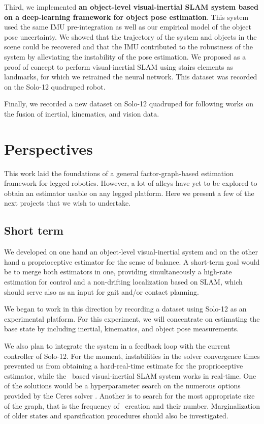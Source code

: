 Third, we implemented \textbf{an object-level visual-inertial SLAM system based on a deep-learning framework for object pose estimation}. This system  used the same 
IMU pre-integration as well as our empirical model of the object pose uncertainty. We showed that the trajectory of the system and objects
in the scene could be recovered and that the IMU contributed to the robustness of the system by alleviating the instability of the pose estimation. We proposed
as a proof of concept to perform visual-inertial SLAM using stairs elements as landmarks, for which we retrained the neural network. This dataset was recorded on the Solo-12 quadruped robot.

Finally, we recorded a new dataset on Solo-12 quadruped for following works on the fusion of inertial, kinematics, and vision data. 

\section{Perspectives}
This work laid the foundations of a general factor-graph-based estimation framework for legged robotics. However, a lot of alleys have yet to be explored 
to obtain an estimator usable on any legged platform. Here we present a few of the next projects that we wish to undertake.

\subsection{Short term}
We developed on one hand an object-level visual-inertial system and on the other hand a proprioceptive estimator for the sense of balance. A short-term goal
would be to merge both estimators in one, providing simultaneously a high-rate estimation for control and a non-drifting localization based on SLAM, which should serve also as an input for gait and/or contact planning. 

We began to work in this direction by recording a dataset using Solo-12 as an experimental platform. For this experiment, we will concentrate on estimating the 
base state by including inertial, kinematics, and object pose measurements. 

We also plan to integrate the system in a feedback loop with the current controller of Solo-12. For the moment, instabilities in the solver convergence times prevented
us from obtaining a hard-real-time estimate for the proprioceptive estimator, while the \apriltag\ based visual-inertial SLAM system works in real-time. One of the solutions would 
be a hyperparameter search on the numerous options provided by the Ceres solver \cite{ceres-solver}. Another is to search for the most appropriate size of the graph,
that is the frequency of \keyframe\ creation and their number. Marginalization of older states and sparsification procedures should also be investigated.



